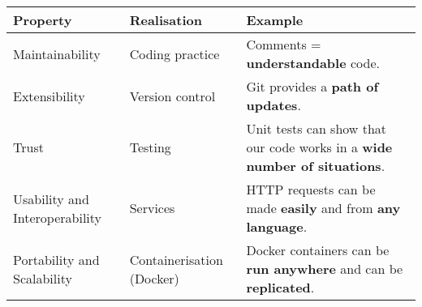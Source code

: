\begin{tabular}{p{4.2cm}|p{2.7cm}|p{5.8cm}}

      \textbf{Property} & \textbf{Realisation} & \textbf{Example}  \\

      \hline

      Maintainability & Coding practice & Comments = \textbf{understandable} code. \\

      \hline

      Extensibility & Version control & Git provides a \textbf{path of updates}. \\

      \hline

      Trust & Testing & Unit tests can show that our code works in a \textbf{wide number of situations}.  \\

      \hline

      Usability and Interoperability & Services & HTTP requests can be made \textbf{easily} and from \textbf{any language}. \\

      \hline

      Portability and Scalability & Containerisation (Docker) & Docker containers can be \textbf{run anywhere} and can be \textbf{replicated}. \\

      \hline

\end{tabular}
